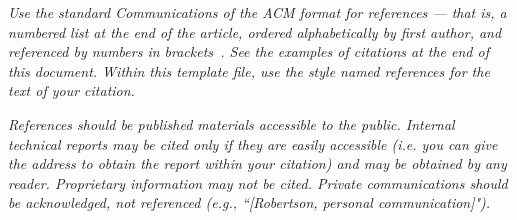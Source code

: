 \documentclass[sigconf]{acmart}
\begin{document}
\emph{Use the standard Communications of the ACM format for references --- that is, a numbered list at the end of the article, ordered alphabetically by first author, and referenced by numbers in brackets~\cite{anderson1992social}. See the examples of citations at the end of this document. Within this template file, use the style named references for the text of your citation.}

\emph{References should be published materials accessible to the public. Internal technical reports may be cited only if they are easily accessible (i.e. you can give the address to obtain the report within your citation) and may be obtained by any reader. Proprietary information may not be cited. Private communications should be acknowledged, not referenced  (e.g., ``[Robertson, personal communication]").}




\end{document}
